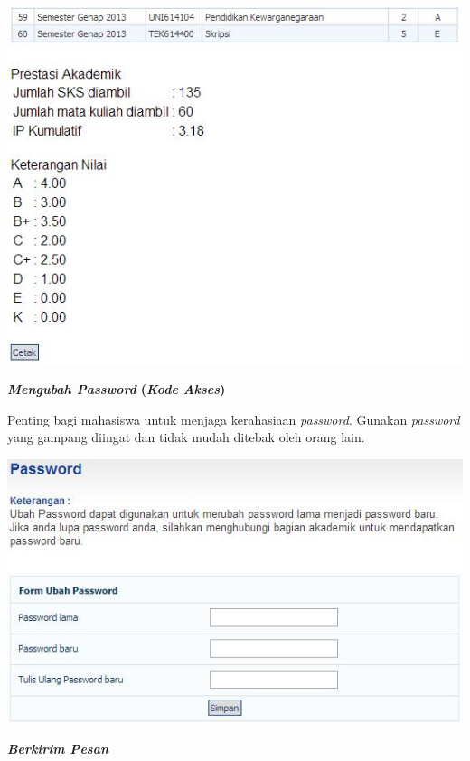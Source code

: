 \documentclass[
]{book}
\begin{document}
\begin{enumerate}
  \includegraphics{static/3.91.jpg}

  \textbf{\emph{Mengubah Password}} \textbf{(\emph{Kode Akses})}

  Penting bagi mahasiswa untuk menjaga kerahasiaan \emph{password}. Gunakan \emph{password} yang gampang diingat dan tidak mudah ditebak oleh orang lain.

  \includegraphics{static/3.92.jpg}

  \textbf{\emph{Berkirim Pesan}}


\end{enumerate}
\end{document}
